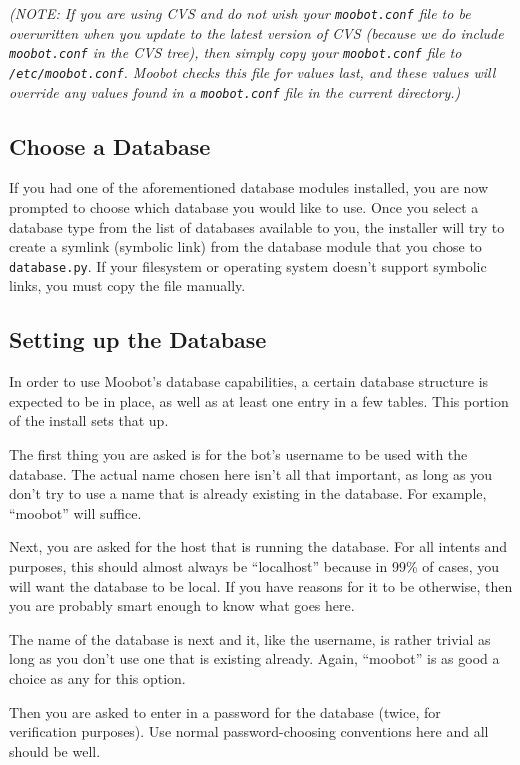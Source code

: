 \documentclass{article}
\begin{document}
\emph{(NOTE: If you are using CVS and do not wish your \texttt{moobot.conf}
file to
be overwritten when you update to the latest version of CVS (because we do
include \texttt{moobot.conf} in the CVS tree), then simply copy your
\texttt{moobot.conf} file to \texttt{/etc/moobot.conf}.  Moobot checks this
file for values last, and these values will override any values found in a
\texttt{moobot.conf} file in the current directory.)}

\subsection{Choose a Database}
If you had one of the aforementioned database modules installed, you are now
prompted to choose which database you would like to use.  Once you select a
database type from the list of databases available to you, the installer will
try to create a symlink (symbolic link) from the database module that you
chose to \texttt{database.py}.  If your filesystem or operating system doesn't
support symbolic links, you must copy the file manually.

\subsection{Setting up the Database}
In order to use Moobot's database capabilities, a certain database structure
is expected to be in place, as well as at least one entry in a few tables.
This portion of the install sets that up.

The first thing you are asked is for the bot's username to be used with the
database.  The actual name chosen here isn't all that important, as long as
you don't try to use a name that is already existing in the database.
For example, ``moobot'' will suffice.

Next, you are asked for the host that is running the database.  For all
intents and purposes, this should almost always be ``localhost'' because in
99\% of cases, you will want the database to be local.  If you have reasons
for it to be otherwise, then you are probably smart enough to know what goes
here.

The name of the database is next and it, like the username, is rather trivial
as long as you don't use one that is existing already.  Again, ``moobot'' is
as good a choice as any for this option.

Then you are asked to enter in a password for the database (twice, for
verification purposes).  Use normal password-choosing conventions here and all
should be well.
\end{document}
